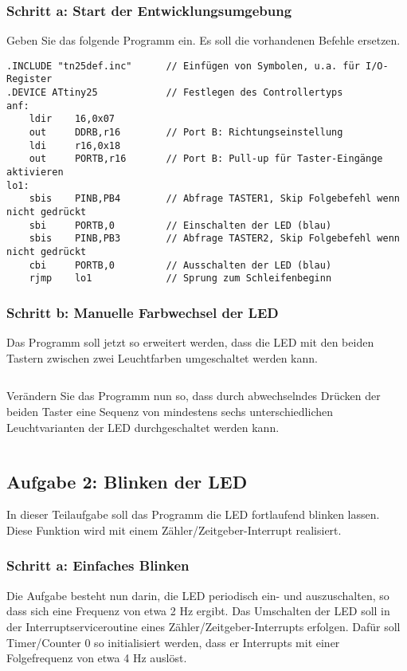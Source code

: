 \documentclass[a4paper,12pt,titlepage]{scrartcl}
\begin{document}
\subsubsection*{Schritt a: Start der Entwicklungsumgebung}
Geben Sie das folgende Programm ein. Es soll die vorhandenen Befehle ersetzen.
\begin{lstlisting}[basicstyle=\tiny]
.INCLUDE "tn25def.inc"      // Einfügen von Symbolen, u.a. für I/O-Register
.DEVICE ATtiny25            // Festlegen des Controllertyps
anf:
    ldir    16,0x07
    out     DDRB,r16        // Port B: Richtungseinstellung
    ldi     r16,0x18
    out     PORTB,r16       // Port B: Pull-up für Taster-Eingänge aktivieren
lo1:
    sbis    PINB,PB4        // Abfrage TASTER1, Skip Folgebefehl wenn nicht gedrückt
    sbi     PORTB,0         // Einschalten der LED (blau)
    sbis    PINB,PB3        // Abfrage TASTER2, Skip Folgebefehl wenn nicht gedrückt
    cbi     PORTB,0         // Ausschalten der LED (blau)
    rjmp    lo1             // Sprung zum Schleifenbeginn
\end{lstlisting}

\subsubsection*{Schritt b: Manuelle Farbwechsel der LED}
Das Programm soll jetzt so erweitert werden, dass die LED mit den beiden Tastern zwischen zwei Leuchtfarben umgeschaltet werden kann.
\begin{lstlisting}[basicstyle=\tiny]
\end{lstlisting}

Verändern Sie das Programm nun so, dass durch abwechselndes Drücken der beiden Taster eine Sequenz von mindestens sechs unterschiedlichen Leuchtvarianten der LED durchgeschaltet werden kann.
\begin{lstlisting}[basicstyle=\tiny]
\end{lstlisting}

\subsection*{Aufgabe 2: Blinken der LED}
In dieser Teilaufgabe soll das Programm die LED fortlaufend blinken lassen. Diese Funktion wird mit einem Zähler/Zeitgeber-Interrupt realisiert.

\subsubsection*{Schritt a: Einfaches Blinken}
Die Aufgabe besteht nun darin, die LED periodisch ein- und auszuschalten, so dass sich eine Frequenz von etwa 2 Hz ergibt. Das Umschalten der LED soll in der Interruptserviceroutine eines Zähler/Zeitgeber-Interrupts erfolgen. Dafür soll Timer/Counter 0 so initialisiert werden, dass er Interrupts mit einer Folgefrequenz von etwa 4 Hz auslöst.
\end{document}
